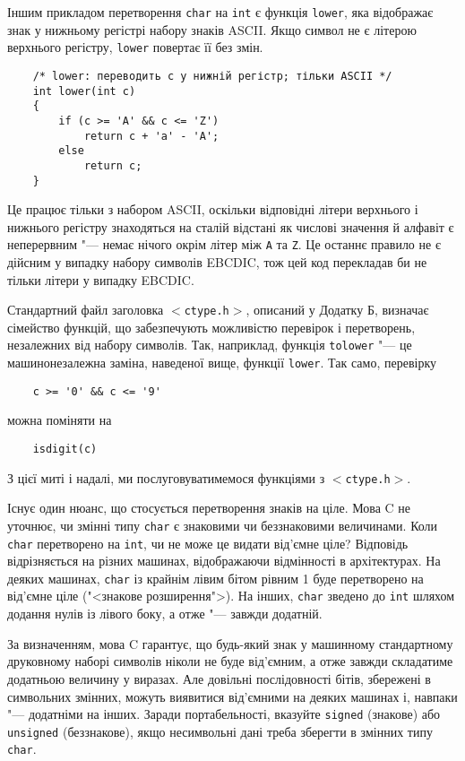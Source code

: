 \documentclass[a4paper,12pt]{book}
\begin{document}
  Іншим прикладом перетворення \texttt{char} на \texttt{int} є функція \texttt{lower}, яка
  відображає знак у нижньому регістрі набору знаків ASCII. Якщо символ не є літерою
  верхнього регістру, \texttt{lower} повертає її без змін.

  \begin{verbatim}
    /* lower: переводить c у нижній регістр; тільки ASCII */
    int lower(int c)
    {
        if (c >= 'A' && c <= 'Z')
            return c + 'a' - 'A';
        else
            return c;
    }
  \end{verbatim}

  Це працює тільки з набором ASCII, оскільки відповідні літери верхнього і нижнього
  регістру знаходяться на сталій відстані як числові значення й алфавіт є неперервним
  "--- немає нічого окрім літер між \texttt{A} та \texttt{Z}. Це останнє правило не є
  дійсним у випадку набору символів EBCDIC, тож цей код перекладав би не тільки літери у
  випадку EBCDIC.

  Стандартний файл заголовка \texttt{\mbox{$<$}ctype.h\mbox{$>$}}, описаний у Додатку
  Б, визначає сімейство функцій, що забезпечують можливістю перевірок і перетворень,
  незалежних від набору символів. Так, наприклад, функція \texttt{tolower} "--- це
  машинонезалежна заміна, наведеної вище, функції \texttt{lower}. Так само, перевірку
  \begin{verbatim}
    c >= '0' && c <= '9'
  \end{verbatim}
  можна поміняти на
  \begin{verbatim}
    isdigit(c)
  \end{verbatim}

  З цієї миті і надалі, ми послуговуватимемося функціями з \texttt{\mbox{$<$}ctype.h\mbox{$>$}}.

  Існує один нюанс, що стосується перетворення знаків на ціле. Мова C не уточнює, чи
  змінні типу \texttt{char} є знаковими чи беззнаковими величинами. Коли
  \texttt{char} перетворено на \texttt{int}, чи не може це видати від'ємне ціле? Відповідь
  відрізняється на різних машинах, відображаючи відмінності в архітектурах. На деяких
  машинах, \texttt{char} із крайнім лівим бітом рівним 1 буде перетворено на від'ємне ціле
  ("<знакове розширення">). На інших, \texttt{char} зведено до \texttt{int}
  шляхом додання нулів із лівого боку, а отже "--- завжди додатній.

  За визначенням, мова C гарантує, що будь-який знак у машинному стандартному друковному
  наборі символів ніколи не буде від'ємним, а отже завжди складатиме додатньою величину
  у виразах. Але довільні послідовності бітів, збережені в символьних змінних, можуть
  виявитися від'ємними на деяких машинах і, навпаки "--- додатніми на інших. Заради
  портабельності, вказуйте \texttt{signed} (знакове) або \texttt{unsigned} (беззнакове),
  якщо несимвольні дані треба зберегти в змінних типу \texttt{char}.
\end{document}
